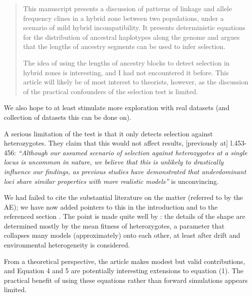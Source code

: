 

\begin{quote}
    This manuscript presents a discussion of patterns of linkage and allele frequency clines in a hybrid zone between two populations, under a scenario of mild hybrid incompatibility. It presents deterministic equations for the distribution of ancestral haplotypes along the genome and argues that the lengths of ancestry segments can be used to infer selection.

    The idea of using the lengths of ancestry blocks to detect selection in hybrid zones is interesting, and I had not encountered it before. This article will likely be of most interest to theorists, however, as the discussion of the practical confounders of the selection test is limited. 
\end{quote}

We also hope to at least stimulate more exploration with real datasets
(and collection of datasets this can be done on).

\begin{point}{\revref}
    A serious limitation of the test is that it only detects selection against heterozygotes. They claim that this would not affect results, [previously at] l.453-456:
    \textit{``Although our assumed scenario of selection against heterozygotes at a single locus is uncommon in nature, we believe that this is unlikely to drastically influence our findings, as previous studies have demonstrated that underdominant loci share similar properties with more realistic models''}
    is unconvincing.
\end{point}

\reply
We had failed to cite the substantial literature on the matter (referred to by the AE);
we have now added pointers to this in the introduction  and to the referenced section \revref.
The point is made quite well by \citet{Slatkin1973}: the details of the shape are determined mostly by the mean fitness of heterozygotes,
a parameter that collapses many models (approximately) onto each other,
at least after drift and environmental heterogeneity is considered.

\begin{point}{}
    From a theoretical perspective, the article makes modest but valid contributions, and  Equation 4 and 5 are potentially interesting extensions to equation (1). 
    The practical benefit of using these equations rather than forward simulations appears limited.
\end{point}

